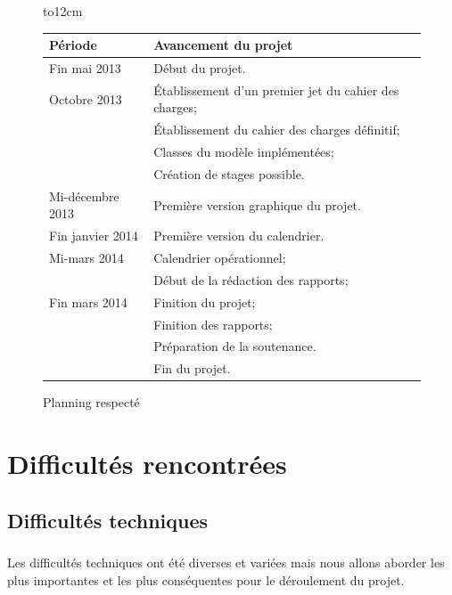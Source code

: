 \documentclass[a4paper,10pt]{report}
\begin{document}
    
    \begin{figure}[H]
	\hbox to12cm{\hss
	\begin{tabular}{|l|l|}
	  \hline
	    \textbf{Période} &  \textbf{Avancement du projet}\\
	  \hline
	    Fin mai 2013 & Début du projet.\\
	  \hline
	    Octobre 2013 & Établissement d'un premier jet du cahier des charges;\\
			  & Établissement du cahier des charges définitif;\\
			  & Classes du modèle implémentées;\\
			  & Création de stages possible.\\
	  \hline
	    Mi-décembre 2013 & Première version graphique du projet.\\
	  \hline
	    Fin janvier 2014 & Première version du calendrier.\\
	  \hline
	    Mi-mars 2014 & Calendrier opérationnel;\\
			  & Début de la rédaction des rapports;\\
	  \hline
	    Fin mars 2014 & Finition du projet;\\
			  & Finition des rapports;\\
			  & Préparation de la soutenance.\\
			  & Fin du projet.\\
	  \hline
	\end{tabular}
      \hss}
      \caption{Planning respecté}
    \end{figure}
    



    
    

    
    
  \chapter{Difficultés rencontrées}
    \section{Difficultés techniques}
      \paragraph{}
	Les difficultés techniques ont été diverses et variées mais nous allons aborder les plus importantes et les plus conséquentes pour le déroulement du projet.
      
\end{document}
